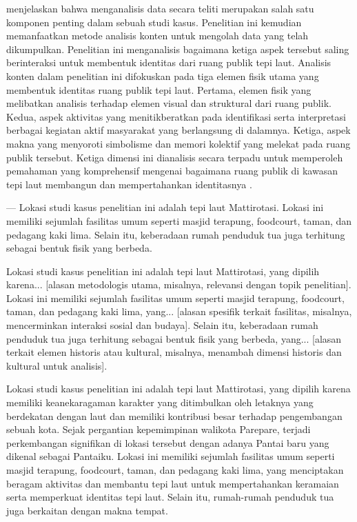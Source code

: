 \documentclass[11pt]{simart} %
\begin{document}
\cite{wiraguna2024}  menjelaskan bahwa menganalisis data secara teliti merupakan salah satu komponen penting dalam sebuah studi kasus.
Penelitian ini kemudian memanfaatkan metode analisis konten untuk mengolah data yang telah dikumpulkan. Penelitian ini menganalisis bagaimana ketiga aspek tersebut saling berinteraksi untuk membentuk identitas dari ruang publik tepi laut.
Analisis konten dalam penelitian ini difokuskan pada tiga elemen fisik utama yang membentuk identitas ruang publik tepi laut.
Pertama, elemen fisik yang melibatkan analisis terhadap elemen visual dan struktural dari ruang publik.
Kedua, aspek aktivitas yang menitikberatkan pada identifikasi serta interpretasi berbagai kegiatan aktif masyarakat yang berlangsung di dalamnya.
Ketiga, aspek makna yang menyoroti simbolisme dan memori kolektif yang melekat pada ruang publik tersebut.
Ketiga dimensi ini dianalisis secara terpadu untuk memperoleh pemahaman yang komprehensif mengenai bagaimana ruang publik di kawasan tepi laut membangun dan mempertahankan identitasnya \citep{iqbal2020,ujang2017}.

---
Lokasi studi kasus penelitian ini adalah tepi laut Mattirotasi. Lokasi ini memiliki sejumlah fasilitas umum seperti masjid terapung, foodcourt, taman, dan pedagang kaki lima. Selain itu, keberadaan rumah penduduk tua juga terhitung sebagai bentuk fisik yang berbeda.

Lokasi studi kasus penelitian ini adalah tepi laut Mattirotasi, yang dipilih karena... [alasan metodologis utama, misalnya, relevansi dengan topik penelitian]. Lokasi ini memiliki sejumlah fasilitas umum seperti masjid terapung, foodcourt, taman, dan pedagang kaki lima, yang... [alasan spesifik terkait fasilitas, misalnya, mencerminkan interaksi sosial dan budaya]. Selain itu, keberadaan rumah penduduk tua juga terhitung sebagai bentuk fisik yang berbeda, yang... [alasan terkait elemen historis atau kultural, misalnya, menambah dimensi historis dan kultural untuk analisis].

Lokasi studi kasus penelitian ini adalah tepi laut Mattirotasi, yang dipilih karena memiliki keanekaragaman karakter yang ditimbulkan oleh letaknya yang berdekatan dengan laut dan memiliki kontribusi besar terhadap pengembangan sebuah kota.
Sejak pergantian kepemimpinan walikota Parepare, terjadi perkembangan signifikan di lokasi tersebut dengan adanya Pantai baru yang dikenal sebagai Pantaiku.
Lokasi ini memiliki sejumlah fasilitas umum seperti masjid terapung, foodcourt, taman, dan pedagang kaki lima, yang menciptakan beragam aktivitas dan membantu tepi laut untuk mempertahankan keramaian serta memperkuat identitas tepi laut.
Selain itu, rumah-rumah penduduk tua juga berkaitan dengan makna tempat.
\end{document}
